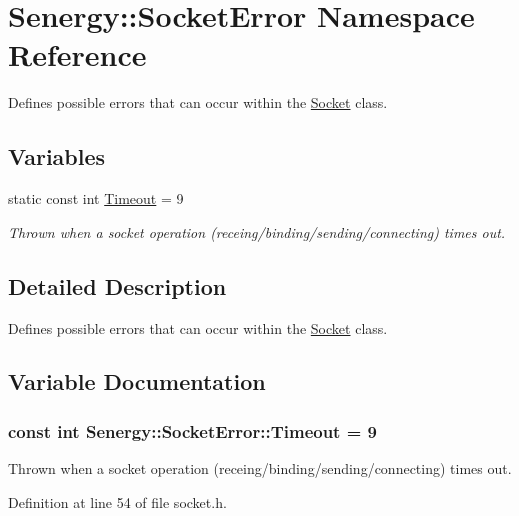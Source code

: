 \hypertarget{namespace_senergy_1_1_socket_error}{\section{Senergy\-:\-:Socket\-Error Namespace Reference}
\label{namespace_senergy_1_1_socket_error}
}


Defines possible errors that can occur within the \hyperlink{class_senergy_1_1_socket}{Socket} class.  


\subsection*{Variables}
\begin{DoxyCompactItemize}
\item 
static const int \hyperlink{namespace_senergy_1_1_socket_error_aa78be48fe668e1748c69b145a3c3fe16}{Timeout} = 9
\begin{DoxyCompactList}\small\item\em Thrown when a socket operation (receing/binding/sending/connecting) times out. \end{DoxyCompactList}\end{DoxyCompactItemize}


\subsection{Detailed Description}
Defines possible errors that can occur within the \hyperlink{class_senergy_1_1_socket}{Socket} class. 

\subsection{Variable Documentation}
\hypertarget{namespace_senergy_1_1_socket_error_aa78be48fe668e1748c69b145a3c3fe16}{
\subsubsection[{Timeout}]{\setlength{\rightskip}{0pt plus 5cm}const int Senergy\-::\-Socket\-Error\-::\-Timeout = 9\hspace{0.3cm}{\ttfamily [static]}}}\label{namespace_senergy_1_1_socket_error_aa78be48fe668e1748c69b145a3c3fe16}


Thrown when a socket operation (receing/binding/sending/connecting) times out. 



Definition at line 54 of file socket.\-h.

